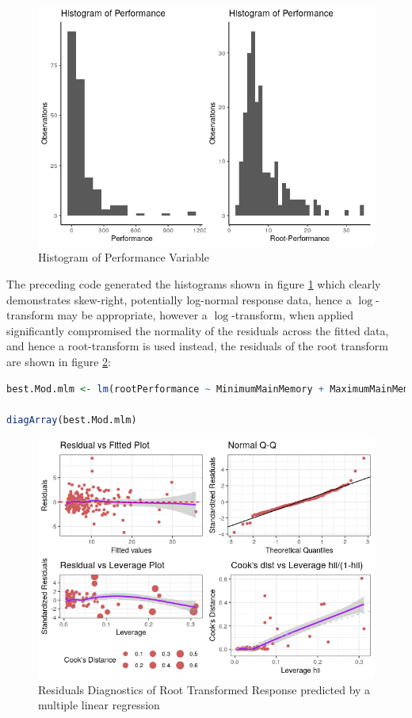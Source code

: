 \documentclass[
]{article}
\begin{document}
\begin{figure}
	\centering
	\includegraphics[width=0.7\linewidth]{SecAssignment_files/figure-html/unnamed-chunk-20-1.png}
	\caption{Histogram of Performance Variable}
	\label{histPerf}
\end{figure}


The preceding code generated the histograms shown in figure \ref{histPerf} which clearly demonstrates skew-right, potentially log-normal response data, hence a
$\log$-transform may be appropriate, however a $\log$-transform, when applied significantly
compromised the normality of the residuals across the fitted data, and
hence a root-transform is used instead, the residuals of the root transform are shown in figure \ref{rootresD}:

\begin{lstlisting}[language=R]
best.Mod.mlm <- lm(rootPerformance ~ MinimumMainMemory + MaximumMainMemory + CacheSize + MaximumNumberOfChannels, cpu)

diagArray(best.Mod.mlm)
\end{lstlisting}

\begin{figure} [h]
	\centering
	\includegraphics[width=0.7\linewidth]{SecAssignment_files/figure-html/unnamed-chunk-21-1.png}
	\caption{Residuals Diagnostics of Root Transformed Response predicted by a multiple linear regression}
	\label{rootresD}
\end{figure}
\end{document}

